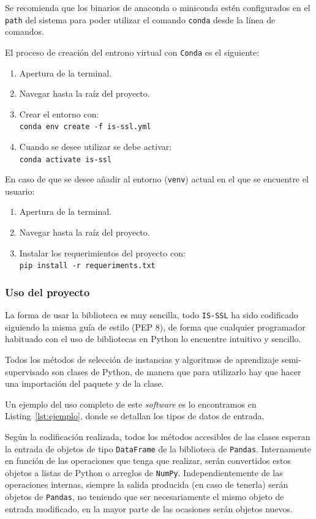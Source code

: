Se recomienda que los binarios de anaconda o miniconda estén configurados en el \texttt{path} del sistema para poder utilizar el comando \texttt{conda} desde la línea de comandos.

El proceso de creación del entrono virtual con \texttt{Conda} es el siguiente:
\begin{enumerate}
\tightlist
\item Apertura de la terminal.
\item Navegar hasta la raíz del proyecto.
\item Crear el entorno con:\\
\texttt{conda env create -f is-ssl.yml}
\item Cuando se desee utilizar se debe activar:\\
\texttt{conda activate is-ssl}
\end{enumerate}

En caso de que se desee añadir al entorno (\texttt{venv}) actual en el que se encuentre el usuario:
\begin{enumerate}
\tightlist
\item Apertura de la terminal.
\item Navegar hasta la raíz del proyecto.
\item Instalar los requerimientos del proyecto con:\\
\texttt{pip install -r requeriments.txt}
\end{enumerate}

\subsubsection{Uso del proyecto}
La forma de usar la biblioteca es muy sencilla, todo \texttt{IS-SSL} ha sido codificado siguiendo la misma guía de estilo (PEP 8), de forma que cualquier programador habituado con el uso de bibliotecas en Python lo encuentre intuitivo y sencillo.

Todos los métodos de selección de instancias y algoritmos de aprendizaje semi-supervisado son clases de Python, de manera que para utilizarlo hay que hacer una importación del paquete y de la clase.

Un ejemplo del uso completo de este \textit{software} es lo encontramos en Listing~\ref{lst:ejemplo}, donde se detallan los tipos de datos de entrada.

Según la codificación realizada, todos los métodos accesibles de las clases esperan la entrada de objetos de tipo \texttt{DataFrame} de la biblioteca de \texttt{Pandas}. Internamente en función de las operaciones que tenga que realizar, serán convertidos estos objetos a listas de Python o arreglos de \texttt{NumPy}. Independientemente de las operaciones internas, siempre la salida producida (en caso de tenerla) serán objetos de \texttt{Pandas}, no teniendo que ser necesariamente el mismo objeto de entrada modificado, en la mayor parte de las ocasiones serán objetos nuevos.

